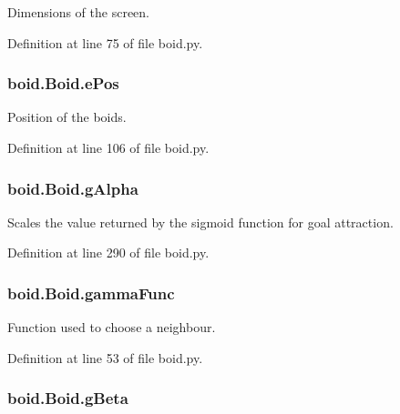 Dimensions of the screen. 



Definition at line 75 of file boid.\-py.

\hypertarget{classboid_1_1Boid_a15b3d73058c73aed19d2e9fb0266805d}{
\subsubsection[{e\-Pos}]{\setlength{\rightskip}{0pt plus 5cm}boid.\-Boid.\-e\-Pos}}\label{classboid_1_1Boid_a15b3d73058c73aed19d2e9fb0266805d}


Position of the boids. 



Definition at line 106 of file boid.\-py.

\hypertarget{classboid_1_1Boid_a5090639a7e3a489c8dc83bd12b6d1653}{
\subsubsection[{g\-Alpha}]{\setlength{\rightskip}{0pt plus 5cm}boid.\-Boid.\-g\-Alpha}}\label{classboid_1_1Boid_a5090639a7e3a489c8dc83bd12b6d1653}


Scales the value returned by the sigmoid function for goal attraction. 



Definition at line 290 of file boid.\-py.

\hypertarget{classboid_1_1Boid_abce5218cbba7b3d9f12dc78bbb9dab5e}{
\subsubsection[{gamma\-Func}]{\setlength{\rightskip}{0pt plus 5cm}boid.\-Boid.\-gamma\-Func}}\label{classboid_1_1Boid_abce5218cbba7b3d9f12dc78bbb9dab5e}


Function used to choose a neighbour. 



Definition at line 53 of file boid.\-py.

\hypertarget{classboid_1_1Boid_a2c33a265be5079b7b916be49933eccaf}{
\subsubsection[{g\-Beta}]{\setlength{\rightskip}{0pt plus 5cm}boid.\-Boid.\-g\-Beta}}\label{classboid_1_1Boid_a2c33a265be5079b7b916be49933eccaf}


